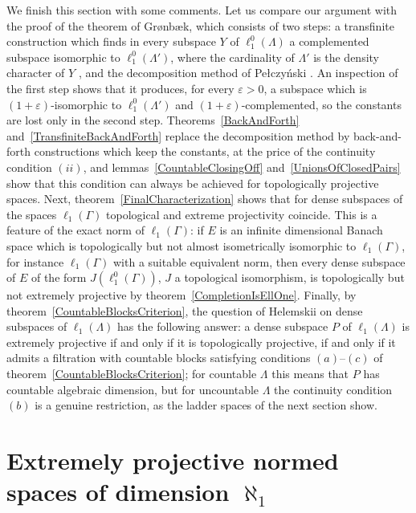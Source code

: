 \documentclass[12pt]{article}
\newcommand{\lo}[1]{\ell_1^0(#1)}
\newcommand{\ellone}[1]{\ell_1(#1)}
\begin{document}
We finish this section with some comments. Let us compare our argument with the proof
of the theorem of Gr{\o}nb{\ae}k, which consists of two steps: a transfinite
construction which finds in every subspace $Y$ of $\lo{\Lambda}$ a
complemented subspace isomorphic to $\lo{\Lambda'}$, where the cardinality of
$\Lambda'$ is the density character of $Y$
\cite[proposition 2.2]{GronLiftProbNormSp}, and the decomposition method of
Pe{\l}czy\'nski \cite[proposition 2.3]{GronLiftProbNormSp}. An inspection of
the first step shows that it produces, for every $\varepsilon>0$, a subspace
which is $(1+\varepsilon)$-isomorphic to $\lo{\Lambda'}$ and
$(1+\varepsilon)$-complemented, so the constants are lost only in the second
step. Theorems~\ref{BackAndForth} and~\ref{TransfiniteBackAndForth} replace
the decomposition method by back-and-forth constructions which keep the
constants, at the price of the continuity condition $(ii)$, and
lemmas~\ref{CountableClosingOff} and~\ref{UnionsOfClosedPairs} show that
this condition can always be achieved for topologically projective spaces. Next,
theorem~\ref{FinalCharacterization}
shows that for dense subspaces of the spaces $\ellone{\Gamma}$ topological and
extreme projectivity coincide. This is a feature of the exact norm of
$\ellone{\Gamma}$: if $E$ is an infinite dimensional Banach space which is
topologically but not almost isometrically isomorphic to $\ellone{\Gamma}$,
for instance $\ellone{\Gamma}$ with a suitable equivalent norm, then every
dense subspace of $E$ of the form $J(\lo{\Gamma})$, $J$ a topological
isomorphism, is topologically but not extremely projective by
theorem~\ref{CompletionIsEllOne}. Finally, by
theorem~\ref{CountableBlocksCriterion}, the question of Helemskii on dense
subspaces of $\ellone{\Lambda}$ has the following answer: a dense subspace
$P$ of $\ellone{\Lambda}$ is extremely projective if and only if it is
topologically projective, if and only if it admits a filtration with
countable blocks satisfying conditions $(a)$--$(c)$ of
theorem~\ref{CountableBlocksCriterion}; for countable $\Lambda$ this means
that $P$ has countable algebraic dimension, but for uncountable $\Lambda$
the continuity condition $(b)$ is a genuine restriction, as the ladder
spaces of the next section show.


\section{Extremely projective normed spaces of dimension
  $\aleph_1$}\label{SectionIntrinsic}
\end{document}
